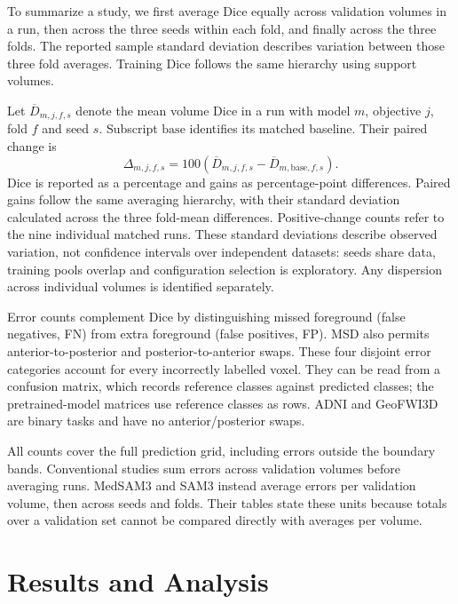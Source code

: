 \documentclass[12pt,a4paper]{article}
\begin{document}
To summarize a study, we first average Dice equally across validation
volumes in a run, then across the three seeds within each fold, and
finally across the three folds. The reported sample standard deviation
describes variation between those three fold averages. Training Dice
follows the same hierarchy using support volumes.

Let $\overline D_{m,j,f,s}$ denote the mean volume Dice in a run with
model $m$, objective $j$, fold $f$ and seed $s$. Subscript
$\mathrm{base}$ identifies its matched baseline. Their paired change is
\begin{equation}
 \Delta_{m,j,f,s}=100\left(
 \overline D_{m,j,f,s}-\overline D_{m,\mathrm{base},f,s}\right).
\label{eq:paired-reported-gain}
\end{equation}
Dice is reported as a percentage and gains as percentage-point
differences. Paired gains follow the same averaging hierarchy, with
their standard deviation calculated across the three fold-mean
differences. Positive-change counts refer to the nine individual
matched runs. These standard deviations describe observed variation,
not confidence intervals over independent datasets: seeds share data,
training pools overlap and configuration selection is exploratory.
Any dispersion across individual volumes is identified separately.

Error counts complement Dice by distinguishing missed foreground
(false negatives, FN) from extra foreground (false positives, FP).
MSD also permits anterior-to-posterior and posterior-to-anterior swaps.
These four disjoint error categories account for every incorrectly
labelled voxel. They can be read from a confusion matrix, which records
reference classes against predicted classes; the pretrained-model
matrices use reference classes as rows. ADNI and GeoFWI3D are binary
tasks and have no anterior/posterior swaps.

All counts cover the full prediction grid, including errors outside
the boundary bands. Conventional studies sum errors across validation
volumes before averaging runs. MedSAM3 and SAM3 instead average errors
per validation volume, then across seeds and folds. Their tables state
these units because totals over a validation set cannot be compared
directly with averages per volume.

\clearpage

\section{Results and Analysis}
\label{sec:results}
\end{document}
